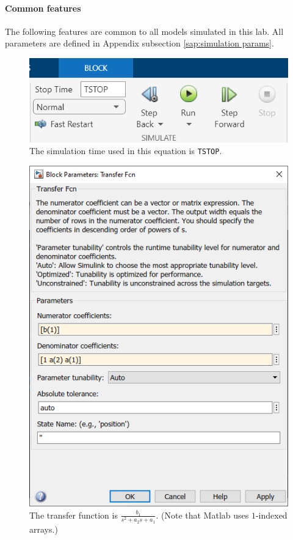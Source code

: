 \documentclass[12pt]{article}
\begin{document}
\paragraph{Common features}\label{par:common features}

The following features are common to all models simulated in this lab.
All parameters are defined in Appendix subsection \ref{sap:simulation params}.

\begin{figure}[h]
    \centering
    \includegraphics[width=(5in/689)*554]{common_simulation_time.png}
    \caption{The simulation time used in this equation is \texttt{TSTOP}.}
    \label{fig:common simulation time}
\end{figure}

\begin{figure}[h]
    \centering
    \includegraphics[width=(5in/689)*464]{common_transfer_fcn.png}
    \caption{The transfer function is $\frac{b_1}{s^2 + a_2 s + a_1}$. (Note that Matlab uses $1$-indexed arrays.)}
    \label{fig:common transfer fcn}
\end{figure}
\end{document}
